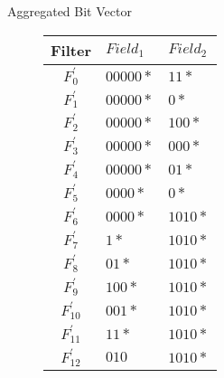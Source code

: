 \documentclass[12pt,dvipdfmx,mathserif,uplatex,aspectratio=32]{beamer}
\makeatletter
\newcommand{\tblcaption}[1]{\def\@captype{table}\caption{#1}}
\makeatother
\begin{document}
\begin{frame}{Aggregated Bit Vector}
\begin{figure}[h]
\begin{minipage}[t]{.4\textwidth}
{{  }
  }
  \end{minipage}
  \hfill
  \begin{minipage}[c]{.55\textwidth}
  {\footnotesize
  {\centering
  \begin{tabular}{c|l|l} 
   Filter   & $Field_{1}$ & $Field_{2}$ \\ \hline
   $F_{0}^{'} $ & $00000*$    & $11*$   \\ \hline
   $F_{1}^{'} $ & $00000*$    & $0*$    \\ \hline
   $F_{2}^{'} $ & $00000*$    & $100*$   \\ \hline
   $F_{3}^{'} $ & $00000*$    & $000*$  \\ \hline
   $F_{4}^{'} $ & $00000*$    & $01*$   \\ \hline
   $F_{5}^{'} $ & $0000*$    & $0*$   \\ \hline
   $F_{6}^{'} $ & $0000*$    & $1010*$   \\ \hline
   $F_{7}^{'} $ & $1*$        & $1010*$  \\ \hline
   $F_{8}^{'} $ & $01*$       & $1010*$  \\ \hline
   $F_{9}^{'} $ & $100*$      & $1010*$  \\ \hline
   $F_{10}^{'} $ & $001*$      & $1010*$  \\ \hline
   $F_{11}^{'} $ & $11*$      & $1010*$  \\ \hline
   $F_{12}^{'} $ & $010$      & $1010*$ 
  \end{tabular}

  }
  }
  \end{minipage}
\end{figure}

\end{frame}
\end{document}
